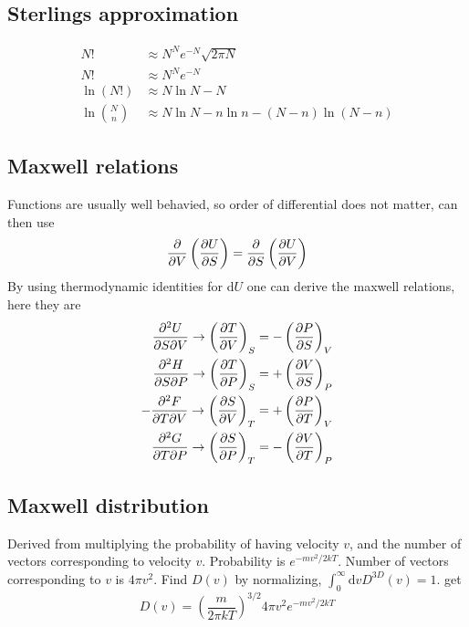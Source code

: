 \documentclass[a4paper, norsk, 8pt]{article}
\begin{document}
\begin{multicols*}{3}
\subsection*{\footnotesize  Sterlings approximation}
\begin{align*}
  N! &\approx N^Ne^{-N}\sqrt{2\pi N} \\
  N! &\approx N^Ne^{-N} \\
  \ln{(N!)} &\approx N\ln{N}-N \\
  \ln{\binom{N}{n}}  &\approx N\ln{N}-n\ln{n}-(N-n)\ln{\left(N-n\right)}
\end{align*}


\subsection*{\footnotesize  Maxwell relations}
Functions are usually well behavied, so order of differential does not matter, can then use
\begin{equation*}
    \pdv{}{V}\left( \pdv{U}{S} \right) = \pdv{}{S}\left( \pdv{U}{V} \right)
\end{equation*}
By using thermodynamic identities for d$U$ one can derive the maxwell relations, here they are
\begin{align*}
  \pdv{U}{S}{V} \rightarrow \left( \pdv{T}{V} \right)_S &= - \left( \pdv{P}{S} \right)_V \\
  \pdv{H}{S}{P} \rightarrow \left( \pdv{T}{P} \right)_S &= + \left( \pdv{V}{S} \right)_P \\
  -\pdv{F}{T}{V} \rightarrow \left( \pdv{S}{V} \right)_T &= + \left( \pdv{P}{T} \right)_V \\
  \pdv{G}{T}{P} \rightarrow \left( \pdv{S}{P} \right)_T &= - \left( \pdv{V}{T} \right)_P \\
\end{align*}

\subsection*{\footnotesize  Maxwell distribution}
Derived from multiplying the probability of having velocity $v$, and the number of vectors corresponding to velocity $v$. Probability is $e^{-mv^2/2kT}$. Number of vectors corresponding to $v$ is $4\pi v^2$. Find $D(v)$ by normalizing, $\int_{0}^{\infty}\mbox{d}v D^{3D}(v)=1$. get
\begin{equation*}
    D(v) = \left(\frac{m}{2\pi k T}\right)^{3/2}4\pi v^2 e^{-mv^2/2kT}
\end{equation*}



\end{multicols*}
\end{document}
